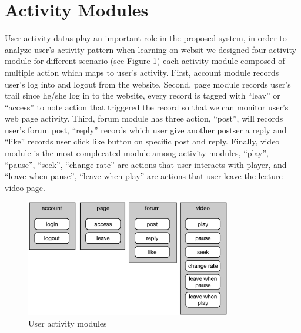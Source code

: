\section{Activity Modules}
User activity datas play an important role in the proposed system, in order to analyze user's activity pattern when learning on websit we designed four activity module for different scenario (see Figure \ref{fig:act-module}) each activity module composed of multiple action which maps to user's activity.
First, account module records user's log into and logout from the website.
Second, page module records user's trail since he/she log in to the website, every record is tagged with ``leav'' or ``access'' to note action that triggered the record so that we can monitor user's web page activity.
Third, forum module has three action, ``post'', will records user's forum post, ``reply'' records which user give another postser a reply and ``like'' records user click like button on specific post and reply.
Finally, video module is the most complecated module among activity modules, ``play'', ``pause'', ``seek'', ``change rate'' are actions that user interacts with player, and ``leave when pause'', ``leave when play'' are actions that user leave the lecture video page.
\begin{figure}[H]
    \centering
    \includegraphics[width = 0.8\textwidth]{fig/activity-module.eps}
    \caption{User activity modules}
    \label{fig:act-module}
\end{figure}

